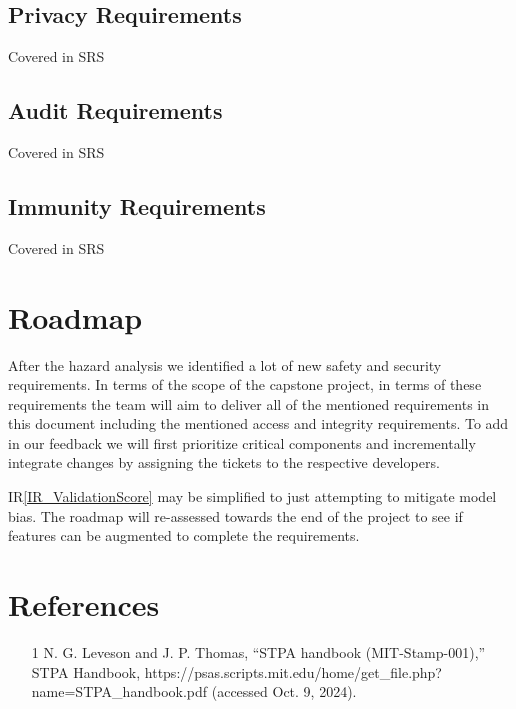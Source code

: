 \documentclass{article}
\begin{document}
\subsection{Privacy Requirements}
Covered in SRS

\subsection{Audit Requirements}
Covered in SRS

\subsection{Immunity Requirements}
Covered in SRS

\section{Roadmap}


After the hazard analysis we identified a lot of new safety and security requirements. In terms of the scope of the capstone project, in terms of these requirements the team will aim to deliver all of the mentioned requirements in this document including the mentioned access and integrity requirements. To add in our feedback we will first prioritize critical components and incrementally integrate changes by assigning the tickets to the respective developers.

IR\ref{IR_ValidationScore} may be simplified to just attempting to mitigate model bias. The roadmap will re-assessed towards the end of the project to see if features can be augmented to complete the requirements.


\newpage{}

\section{References}

\begin{itemize}
    \item [1] N. G. Leveson and J. P. Thomas, “STPA handbook (MIT-Stamp-001),” STPA Handbook, https://psas.scripts.mit.edu/home/get_file.php?name=STPA_handbook.pdf (accessed Oct. 9, 2024).
\end{itemize}

\newpage{}
\end{document}
